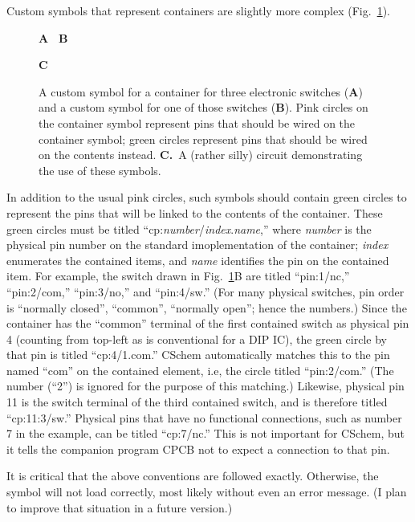 \documentclass[11pt]{report}
\def\subfig#1#2{{\sf\small\bfseries#1}\raisebox{-.2in}{\raisebox{-.5\height}{\texttt{[image: \#2]}}}}
\begin{document}
Custom symbols that represent containers are slightly more complex (Fig.~\ref{fig.cont}). 
%
\begin{figure}[h]
  \mbox{}\hfill
  \subfig{A~}{ug-switchcont}
  \hfill
     \subfig{B~}{ug-switch}
     \hfill\mbox{}

   \mbox{}\hfill
   \subfig{C~~}{ug-sillyswitch}
        \hfill\mbox{}

  \caption{A custom symbol for a container for three electronic
    switches ({\bf A}) and a custom symbol for one of those switches
    ({\bf B}). Pink
    circles on the container symbol represent pins that should be wired on the
    container symbol; green circles represent pins that should be
    wired on the contents instead. {\bf C.}~A (rather silly) circuit
    demonstrating the use of these symbols.}\label{fig.cont}
\end{figure}
%
In addition to the usual pink circles, such symbols should contain
green circles to represent the pins that will be linked to the
contents of the container. These green circles must be titled
``cp:\emph{number}/\emph{index}.\emph{name},'' where \emph{number} is
the physical pin number on the standard imoplementation of the
container; \emph{index} enumerates the contained items, and
\emph{name} identifies the pin on the contained item. For example, the
switch drawn in Fig.~\ref{fig.cont}B are titled ``pin:1/nc,''
``pin:2/com,'' ``pin:3/no,'' and ``pin:4/sw.'' (For many physical
switches, pin order is ``normally closed'', ``common'', ``normally
open''; hence the numbers.) Since the container has the ``common''
terminal of the first contained switch as physical pin 4 (counting
from top-left as is conventional for a DIP IC), the green circle by
that pin is titled ``cp:4/1.com.''  CSchem automatically matches this
to the pin named ``com'' on the contained element, i.e, the circle
titled ``pin:2/com.'' (The number (``2'') is ignored for the purpose
of this matching.)  Likewise, physical pin 11 is the switch terminal
of the third contained switch, and is therefore titled ``cp:11:3/sw.''
Physical pins that have no functional connections, such as number 7 in
the example, can be titled ``cp:7/nc.'' This is not important for
CSchem, but it tells the companion program CPCB not to expect a
connection to that pin.

It is critical that the above conventions are followed
exactly. Otherwise, the symbol will not load correctly, most likely
without even an error message. (I plan to improve that situation in a
future version.)  
\end{document}
